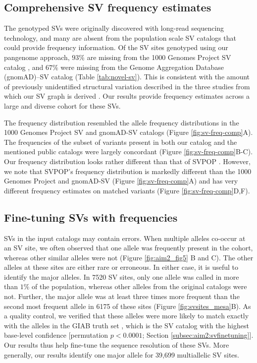 \documentclass[11pt]{ucscthesis}
\begin{document}
\subsection{Comprehensive SV frequency estimates}
The genotyped SVs were originally discovered with long-read sequencing technology, and many are absent from the population scale SV catalogs that could provide frequency information.
Of the SV sites genotyped using our pangenome approach, $93\%$ are missing from the 1000 Genomes Project SV catalog \cite{1000gp_sv_2015}, and $67\%$ were missing from the Genome Aggregation Database (gnomAD)–SV catalog \cite{gnomadsv_2020} (Table \ref{tab:novel-sv}).
This is consistent with the amount of previously unidentified structural variation described in the three studies from which our SV graph is derived \cite{zook_robust_2020, chaisson_sv_2019,audano_hgsvc}.
Our results provide frequency estimates across a large and diverse cohort for these SVs.

The frequency distribution resembled the allele frequency distributions in the 1000 Genomes Project SV and gnomAD-SV catalogs (Figure \ref{fig:sv-freq-comp}A).
The frequencies of the subset of variants present in both our catalog and the mentioned public catalogs were largely concordant (Figure \ref{fig:sv-freq-comp}B-C).
Our frequency distribution looks rather different than that of SVPOP \cite{audano_hgsvc}.
However, we note that SVPOP’s frequency distribution is markedly different than the 1000 Genomes Project and gnomAD-SV (Figure \ref{fig:sv-freq-comp}A) and has very different frequency estimates on matched variants (Figure \ref{fig:sv-freq-comp}D,F).

\subsection{Fine-tuning SVs with frequencies}
SVs in the input catalogs may contain errors.
When multiple alleles co-occur at an SV site, we often observed that one allele was frequently present in the cohort, whereas other similar alleles were not (Figure \ref{fig:aim2_fig5} B and C).
The other alleles at these sites are either rare or erroneous.
In either case, it is useful to identify the major alleles.
In 7520 SV sites, only one allele was called in more than $1\%$ of the population, whereas other alleles from the original catalogs were not.
Further, the major allele was at least three times more frequent than the second most frequent allele in 6175 of these sites (Figure \ref{fig:svsites_mesa}B).
As a quality control, we verified that these alleles were more likely to match exactly with the alleles in the GIAB truth set \cite{zook_robust_2020}, which is the SV catalog with the highest base-level confidence [permutation $p < 0.0001$; Section \ref{subsec:aim2:svfinetuning}].
Our results thus help fine-tune the sequence resolution of these SVs.
More generally, our results identify one major allele for 39,699 multiallelic SV sites.
\end{document}
